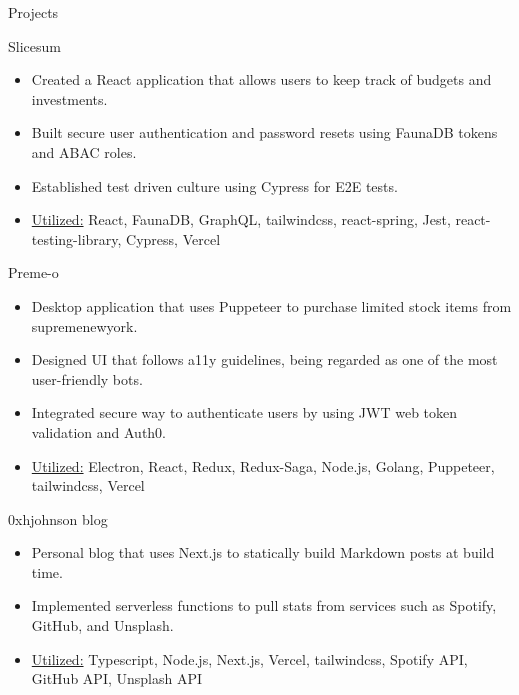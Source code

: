 \documentclass[calibri]{mcdowellcv}
\begin{document}
	\begin{cvsection}{Projects}
		\begin{cvsubsection}{Slicesum}{}{}
			\begin{itemize}
        \item Created a React application that allows users to keep track of budgets and investments.
        \item Built secure user authentication and password resets using FaunaDB tokens and ABAC roles.
        \item Established test driven culture using Cypress for E2E tests.
				\item \underline{Utilized:} React, FaunaDB, GraphQL, tailwindcss, react-spring, Jest, react-testing-library, Cypress, Vercel
    	\end{itemize}
		\end{cvsubsection}

		\begin{cvsubsection}{Preme-o}{}{}
			\begin{itemize}
        \item Desktop application that uses Puppeteer to purchase limited stock items from supremenewyork.
        \item Designed UI that follows a11y guidelines, being regarded as one of the most user-friendly bots.
        \item Integrated secure way to authenticate users by using JWT web token validation and Auth0.
				\item \underline{Utilized:} Electron, React, Redux, Redux-Saga, Node.js, Golang, Puppeteer, tailwindcss, Vercel
    	\end{itemize}
		\end{cvsubsection}

		\begin{cvsubsection}{0xhjohnson blog}{}{}
			\begin{itemize}
        \item Personal blog that uses Next.js to statically build Markdown posts at build time.
        \item Implemented serverless functions to pull stats from services such as Spotify, GitHub, and Unsplash.
				\item \underline{Utilized:} Typescript, Node.js, Next.js, Vercel, tailwindcss, Spotify API, GitHub API, Unsplash API
    	\end{itemize}
		\end{cvsubsection}
	\end{cvsection}
	
\end{document}
